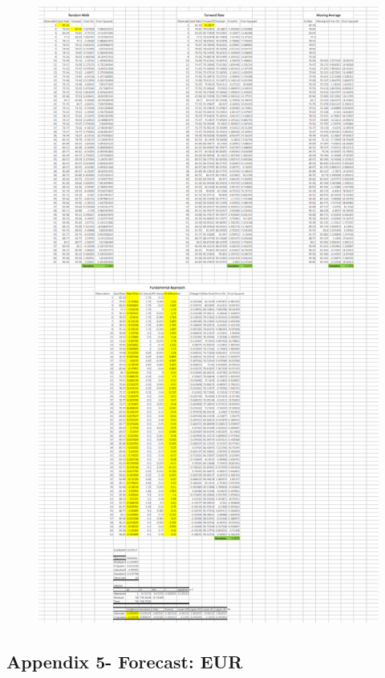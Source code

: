 \documentclass{article}
\let\Oldsubsection\subsection
\renewcommand{\subsection}{\FloatBarrier\Oldsubsection}
\begin{document}
\begin{figure}[h!]
    \centering
    \includegraphics[scale=0.5]{forecasts/JPY.png}
\end{figure}

\break

\subsection*{Appendix 5- Forecast: EUR}
\end{document}
